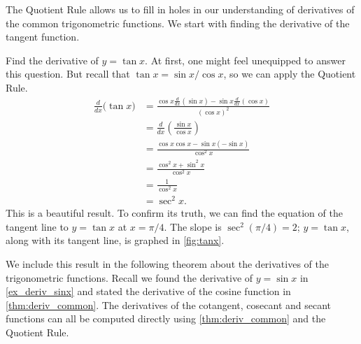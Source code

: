 The Quotient Rule allows us to fill in holes in our understanding of derivatives of the common trigonometric functions. We start with finding the derivative of the tangent function.

{Find the derivative of $y=\tan x$.}
{At first, one might feel unequipped to answer this question. But recall that $\tan x = \sin x/\cos x$, so we can apply the Quotient Rule.
\begin{align*}
	\frac{d}{dx}\Big(\tan x\Big)
	& = \frac{\cos x\frac{d}{dx}(\sin x)-\sin x\frac{d}{dx}(\cos x)}{(\cos x)^2} \\
	&= \frac{d}{dx}\left(\frac{\sin x}{\cos x}\right) \\
	&= \frac{\cos x \cos x - \sin x (-\sin x)}{\cos^2 x} \\
	&= \frac{\cos^2x+\sin^2x}{\cos^2x}\\
	&= \frac{1}{\cos^2x} \\
	&= \sec ^2 x.
\end{align*}
This is a beautiful result. To confirm its truth, we can find the equation of the tangent line to $y=\tan x$ at $x=\pi/4$. The slope is $\sec^2(\pi/4) = 2$; $y=\tan x$, along with its tangent line, is graphed in \autoref{fig:tanx}.
}

We include this result in the following theorem about the derivatives of the trigonometric functions. Recall we found the derivative of $y=\sin x$ in \autoref{ex_deriv_sinx} and stated the derivative of the cosine function in \autoref{thm:deriv_common}. The derivatives of the cotangent, cosecant and secant functions can all be computed directly using \autoref{thm:deriv_common} and the Quotient Rule.

